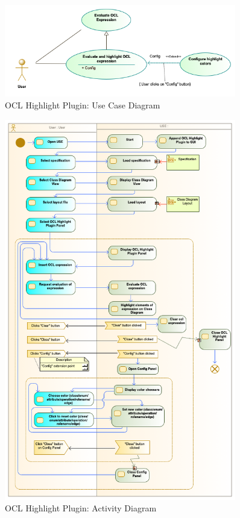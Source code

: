 \begin{figure}[ht]
    \centering
    \includegraphics[width=0.9\textwidth]{Chapters/figures/5_Implementation/01_UseCaseDiagram}
    \caption{OCL Highlight Plugin: Use Case Diagram}
    \label{fig:05_01_usecasediagram}
\end{figure}
    
\begin{figure}[ht]
    \centering
    \includegraphics[width=0.9\textwidth]{Chapters/figures/5_Implementation/01_ActivityDiagram}
    \caption{OCL Highlight Plugin: Activity Diagram}
    \label{fig:05_01_activitydiagram}
\end{figure}

